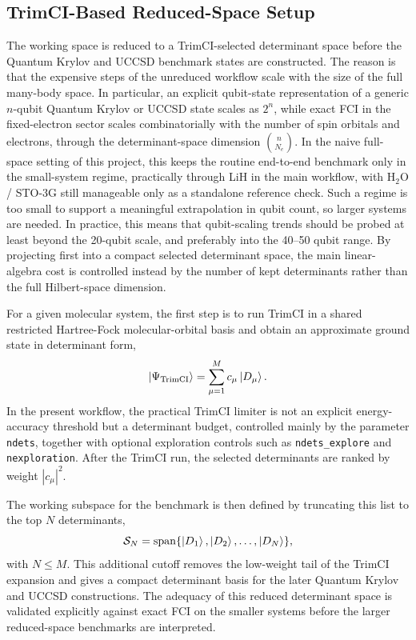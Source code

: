 \subsection{TrimCI-Based Reduced-Space Setup}

The working space is reduced to a TrimCI-selected determinant space before the Quantum Krylov and UCCSD benchmark states are constructed. The reason is that the expensive steps of the unreduced workflow scale with the size of the full many-body space. In particular, an explicit qubit-state representation of a generic $n$-qubit Quantum Krylov or UCCSD state scales as $2^n$, while exact FCI in the fixed-electron sector scales combinatorially with the number of spin orbitals and electrons, through the determinant-space dimension $\binom{n}{N_e}$. In the naive full-space setting of this project, this keeps the routine end-to-end benchmark only in the small-system regime, practically through LiH in the main workflow, with H$_2$O / STO-3G still manageable only as a standalone reference check. Such a regime is too small to support a meaningful extrapolation in qubit count, so larger systems are needed. In practice, this means that qubit-scaling trends should be probed at least beyond the 20-qubit scale, and preferably into the 40--50 qubit range. By projecting first into a compact selected determinant space, the main linear-algebra cost is controlled instead by the number of kept determinants rather than the full Hilbert-space dimension.

For a given molecular system, the first step is to run TrimCI in a shared restricted Hartree-Fock molecular-orbital basis and obtain an approximate ground state in determinant form,
\begin{equation}
\ket{\Psi_{\mathrm{TrimCI}}} = \sum_{\mu=1}^{M} c_{\mu} \ket{D_{\mu}}.
\end{equation}
In the present workflow, the practical TrimCI limiter is not an explicit energy-accuracy threshold but a determinant budget, controlled mainly by the parameter \texttt{ndets}, together with optional exploration controls such as \texttt{ndets\_explore} and \texttt{nexploration}. After the TrimCI run, the selected determinants are ranked by weight $|c_{\mu}|^2$.

The working subspace for the benchmark is then defined by truncating this list to the top $N$ determinants,
\begin{equation}
\mathcal{S}_{N} = \mathrm{span}\{\ket{D_{1}}, \ket{D_{2}}, \ldots, \ket{D_{N}}\},
\end{equation}
with $N \le M$. This additional cutoff removes the low-weight tail of the TrimCI expansion and gives a compact determinant basis for the later Quantum Krylov and UCCSD constructions. The adequacy of this reduced determinant space is validated explicitly against exact FCI on the smaller systems before the larger reduced-space benchmarks are interpreted.

